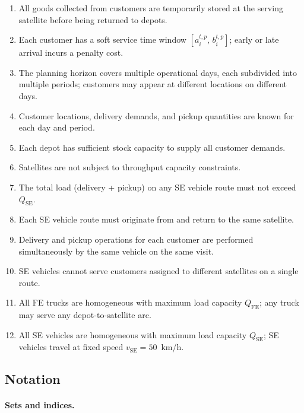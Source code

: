 \documentclass[11pt, a4paper]{article}
\newcommand{\QFE}{Q_{\mathrm{FE}}}
\newcommand{\QSE}{Q_{\mathrm{SE}}}
\newcommand{\vSE}{v_{\mathrm{SE}}}
\numberwithin{equation}{section}
\begin{document}
\begin{enumerate}
  \item All goods collected from customers are temporarily stored at the
        serving satellite before being returned to depots.
  \item Each customer has a soft service time window $[a_i^{t,p},\,b_i^{t,p}]$;
        early or late arrival incurs a penalty cost.
  \item The planning horizon covers multiple operational days, each subdivided
        into multiple periods; customers may appear at different locations on
        different days.
  \item Customer locations, delivery demands, and pickup quantities are known
        for each day and period.
  \item Each depot has sufficient stock capacity to supply all customer demands.
  \item Satellites are not subject to throughput capacity constraints.
  \item The total load (delivery + pickup) on any SE vehicle route must not
        exceed $\QSE$.
  \item Each SE vehicle route must originate from and return to the same
        satellite.
  \item Delivery and pickup operations for each customer are performed
        simultaneously by the same vehicle on the same visit.
  \item SE vehicles cannot serve customers assigned to different satellites
        on a single route.
  \item All FE trucks are homogeneous with maximum load capacity $\QFE$;
        any truck may serve any depot-to-satellite arc.
  \item All SE vehicles are homogeneous with maximum load capacity $\QSE$;
        SE vehicles travel at fixed speed $\vSE = 50$~km/h.
\end{enumerate}

\subsection{Notation}

\paragraph{Sets and indices.}
\end{document}
